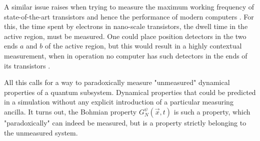 \documentclass[11pt, a4paper]{article} %
\begin{document}
A similar issue raises when trying to measure the maximum working frequency of state-of-the-art transistors and hence the performance of modern computers \cite{modern}. For this, the time spent by electrons in nano-scale transistors, the dwell time in the active region, must be measured. One could place position detectors in the two ends $a$ and $b$ of the active region, but this would result in a highly contextual measurement, when in operation no computer has such detectors in the ends of its transistors \cite{tunnel1, tunnel2}. 

All this calls for a way to paradoxically measure "unmeasured" dynamical properties of a quantum subsystem. Dynamical properties that could be predicted in a simulation without any explicit introduction of a particular measuring ancilla. It turns out, the Bohmian property $G^\psi_N(\vec{x},t)$ is such a property, which "paradoxically" can indeed be measured, but is a property strictly belonging to the unmeasured system.
\end{document}
